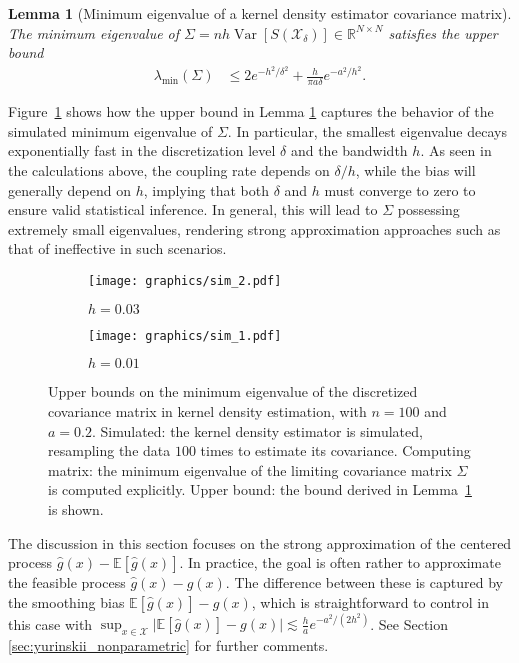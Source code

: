 \documentclass[11pt,lof]{puthesis}
\newcommand{\R}{\ensuremath{\mathbb{R}}}
\newcommand{\E}{\ensuremath{\mathbb{E}}}
\newcommand{\cX}{\ensuremath{\mathcal{X}}}
\DeclareMathOperator{\Var}{Var}
\theoremstyle{break}
\newtheorem{lemma}{Lemma}[section]
\theoremstyle{proof}
\begin{document}
\begin{lemma}[Minimum eigenvalue of a
kernel density estimator covariance matrix]%
\label{lem:yurinskii_kde_eigenvalue}
%
The minimum eigenvalue of
$\Sigma=n h\Var[S(\cX_\delta)] \in \R^{N \times N}$
satisfies the upper bound
%
\begin{align*}
\lambda_{\min}(\Sigma)
&\leq
2 e^{-h^2/\delta^2}
+ \frac{h}{\pi a \delta}
e^{-a^2 / h^2}.
\end{align*}
\end{lemma}
%
Figure~\ref{fig:yurinskii_min_eig} shows how the upper bound in Lemma
\ref{lem:yurinskii_kde_eigenvalue} captures the behavior of the simulated
minimum
eigenvalue of $\Sigma$. In particular, the smallest eigenvalue decays
exponentially fast in the discretization level $\delta$ and the bandwidth $h$.
As seen in the calculations above, the coupling rate depends on $\delta / h$,
while the bias will generally depend on $h$, implying that both $\delta$ and
$h$ must converge to zero to ensure valid statistical inference. In general,
this will lead to $\Sigma$ possessing extremely small eigenvalues, rendering
strong approximation approaches such as that of \citet{li2020uniform}
ineffective in such scenarios.
%
\begin{figure}[t]
\centering
\begin{subfigure}{0.49\textwidth}
\centering
\texttt{[image: graphics/sim\_2.pdf]}
\caption{$h = 0.03$}
\end{subfigure}
\begin{subfigure}{0.49\textwidth}
\centering
\texttt{[image: graphics/sim\_1.pdf]}
\caption{$h = 0.01$}
\end{subfigure}
\caption[Minimum eigenvalue of the kernel density covariance matrix]{
Upper bounds on the minimum eigenvalue of the discretized covariance
matrix in kernel density estimation,
with $n=100$ and $a = 0.2$.
Simulated: the kernel density estimator is simulated,
resampling the data $100$ times
to estimate its covariance.
Computing matrix: the minimum eigenvalue of the limiting covariance
matrix $\Sigma$ is computed explicitly.
Upper bound: the bound derived in
Lemma~\ref{lem:yurinskii_kde_eigenvalue}
is shown.
}
\label{fig:yurinskii_min_eig}
\end{figure}

The discussion in this section focuses on the strong approximation of the
centered process $\hat g(x)-\E [ \hat g(x) ]$. In practice, the goal is often
rather to approximate the feasible process $\hat g(x)- g(x)$. The difference
between these is captured by the smoothing bias $\E [ \hat g(x) ] - g(x)$,
which is straightforward to control in this case with
$\sup_{x \in \cX} \big| \E [ \hat g(x) ] - g(x) \big|
\lesssim \frac{h}{a} e^{-a^2 / (2 h^2)}$.
See Section \ref{sec:yurinskii_nonparametric} for further
comments.
\end{document}

